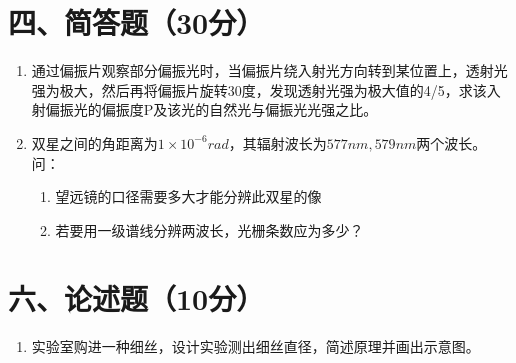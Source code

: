 \documentclass[12pt, a4paper]{article}
\theoremstyle{solution}
\begin{document}
\section*{四、简答题（30分）}
\begin{enumerate}
    \item 通过偏振片观察部分偏振光时，当偏振片绕入射光方向转到某位置上，透射光强为极大，然后再将偏振片旋转30度，发现透射光强为极大值的4/5，求该入射偏振光的偏振度P及该光的自然光与偏振光光强之比。
    \item 双星之间的角距离为$1\times10^{-6}rad$，其辐射波长为$577nm,579nm$两个波长。问：
          \begin{enumerate}
            \item 望远镜的口径需要多大才能分辨此双星的像
            \item 若要用一级谱线分辨两波长，光栅条数应为多少？
          \end{enumerate}
\end{enumerate}
\section*{六、论述题（10分）}
\begin{enumerate}
    \item 实验室购进一种细丝，设计实验测出细丝直径，简述原理并画出示意图。
\end{enumerate}
\end{document}
